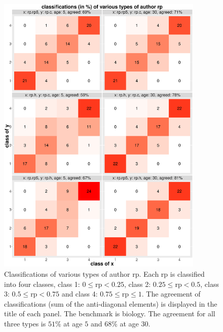 \begin{figure}[ht!]
    \centering
    \includegraphics[width=0.88\textwidth]{figures/compare_autrp/heatmap_class_agreement.eps}
    \caption{Classifications of various types of author rp. Each rp is classified into four classes, class 1: $0 \le \text{rp} < 0.25$, class 2: $0.25 \le \text{rp} < 0.5$, class 3: $0.5 \le \text{rp} < 0.75$ and class 4: $0.75 \le \text{rp} \le 1$. The agreement of classifications (sum of the anti-diagonal elements) is displayed in the title of each panel. The benchmark is biology. The agreement for all three types is $51 \%$ at age $5$ and $68 \%$ at age $30$.}
    \label{fig:aut_rp_class}
\end{figure}

